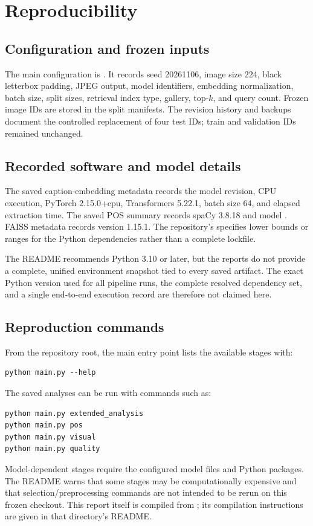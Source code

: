 \chapter{Reproducibility}
\label{ch:reproducibility}

\section{Configuration and frozen inputs}
The main configuration is . It records seed 20261106, image size 224, black letterbox padding, JPEG output, model identifiers, embedding normalization, batch size, split sizes, retrieval index type, gallery, top-\(k\), and query count. Frozen image IDs are stored in the split manifests. The revision history and backups document the controlled replacement of four test IDs; train and validation IDs remained unchanged.

\section{Recorded software and model details}
The saved caption-embedding metadata records the model revision, CPU execution, PyTorch 2.15.0+cpu, Transformers 5.22.1, batch size 64, and elapsed extraction time. The saved POS summary records spaCy 3.8.18 and model . FAISS metadata records version 1.15.1. The repository's  specifies lower bounds or ranges for the Python dependencies rather than a complete lockfile.

The README recommends Python 3.10 or later, but the reports do not provide a complete, unified environment snapshot tied to every saved artifact. The exact Python version used for all pipeline runs, the complete resolved dependency set, and a single end-to-end execution record are therefore not claimed here.

\section{Reproduction commands}
From the repository root, the main entry point lists the available stages with:
\begin{lstlisting}[basicstyle=\ttfamily\small,frame=single,backgroundcolor=\color{ProjectGrey}]
python main.py --help
\end{lstlisting}

The saved analyses can be run with commands such as:
\begin{lstlisting}[basicstyle=\ttfamily\small,frame=single,backgroundcolor=\color{ProjectGrey}]
python main.py extended_analysis
python main.py pos
python main.py visual
python main.py quality
\end{lstlisting}

Model-dependent stages require the configured model files and Python packages. The README warns that some stages may be computationally expensive and that selection/preprocessing commands are not intended to be rerun on this frozen checkout. This report itself is compiled from ; its compilation instructions are given in that directory's README.
